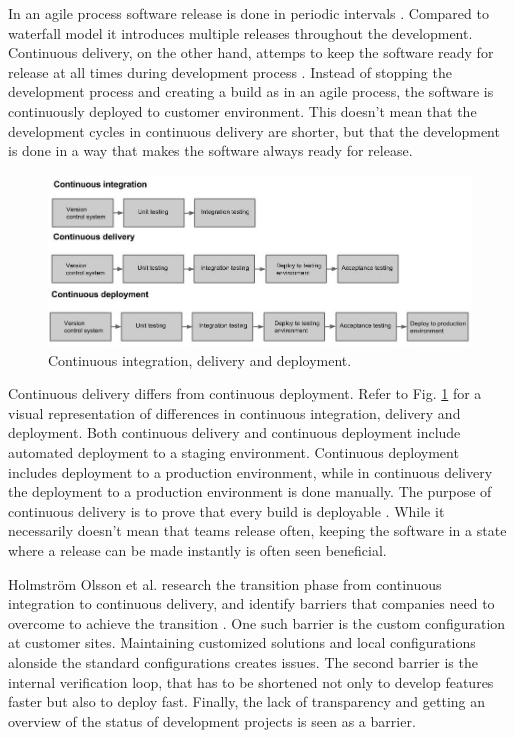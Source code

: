 \documentclass[english, grading]{tktltiki2}
\theoremstyle{definition}
\theoremstyle{remark}
\begin{document}
In an agile process software release is done in periodic intervals \cite{cockburn2002agile}. Compared to waterfall model it introduces multiple releases throughout the development. Continuous delivery, on the other hand, attemps to keep the software ready for release at all times during development process \cite{cdbook}. Instead of stopping the development process and creating a build as in an agile process, the software is continuously deployed to customer environment. This doesn't mean that the development cycles in continuous delivery are shorter, but that the development is done in a way that makes the software always ready for release.
\begin{figure}[h]
	\centering
	\includegraphics[width=5.0in]{rtvd.jpg}
	\caption{Continuous integration, delivery and deployment.}
	\label{fig2}
\end{figure}
Continuous delivery differs from continuous deployment. Refer to Fig. \ref{fig2} for a visual representation of differences in continuous integration, delivery and deployment. Both continuous delivery and continuous deployment include automated deployment to a staging environment. Continuous deployment includes deployment to a production environment, while in continuous delivery the deployment to a production environment is done manually. The purpose of continuous delivery is to prove that every build is deployable \cite{cdbook}. While it necessarily doesn't mean that teams release often, keeping the software in a state where a release can be made instantly is often seen beneficial.

Holmström Olsson et al. research the transition phase from continuous integration to continuous delivery, and identify barriers that companies need to overcome to achieve the transition \cite{olsson2012climbing}. One such barrier is the custom configuration at customer sites. Maintaining customized solutions and local configurations alonside the standard configurations creates issues. The second barrier is the internal verification loop, that has to be shortened not only to develop features faster but also to deploy fast. Finally, the lack of transparency and getting an overview of the status of development projects is seen as a barrier.
\end{document}
